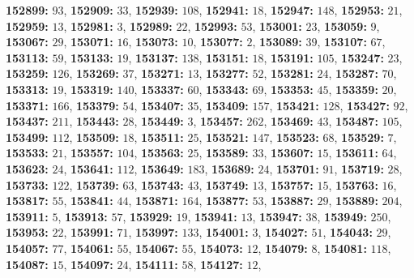 \textsf{\bfseries 152899:} $93$, \textsf{\bfseries 152909:} $33$, \textsf{\bfseries 152939:} $108$, \textsf{\bfseries 152941:} $18$, \textsf{\bfseries 152947:} $148$, \textsf{\bfseries 152953:} $21$, \textsf{\bfseries 152959:} $13$, \textsf{\bfseries 152981:} $3$, \textsf{\bfseries 152989:} $22$, \textsf{\bfseries 152993:} $53$, \textsf{\bfseries 153001:} $23$, \textsf{\bfseries 153059:} $9$, \textsf{\bfseries 153067:} $29$, \textsf{\bfseries 153071:} $16$, \textsf{\bfseries 153073:} $10$, \textsf{\bfseries 153077:} $2$, \textsf{\bfseries 153089:} $39$, \textsf{\bfseries 153107:} $67$, \textsf{\bfseries 153113:} $59$, \textsf{\bfseries 153133:} $19$, \textsf{\bfseries 153137:} $138$, \textsf{\bfseries 153151:} $18$, \textsf{\bfseries 153191:} $105$, \textsf{\bfseries 153247:} $23$, \textsf{\bfseries 153259:} $126$, \textsf{\bfseries 153269:} $37$, \textsf{\bfseries 153271:} $13$, \textsf{\bfseries 153277:} $52$, \textsf{\bfseries 153281:} $24$, \textsf{\bfseries 153287:} $70$, \textsf{\bfseries 153313:} $19$, \textsf{\bfseries 153319:} $140$, \textsf{\bfseries 153337:} $60$, \textsf{\bfseries 153343:} $69$, \textsf{\bfseries 153353:} $45$, \textsf{\bfseries 153359:} $20$, \textsf{\bfseries 153371:} $166$, \textsf{\bfseries 153379:} $54$, \textsf{\bfseries 153407:} $35$, \textsf{\bfseries 153409:} $157$, \textsf{\bfseries 153421:} $128$, \textsf{\bfseries 153427:} $92$, \textsf{\bfseries 153437:} $211$, \textsf{\bfseries 153443:} $28$, \textsf{\bfseries 153449:} $3$, \textsf{\bfseries 153457:} $262$, \textsf{\bfseries 153469:} $43$, \textsf{\bfseries 153487:} $105$, \textsf{\bfseries 153499:} $112$, \textsf{\bfseries 153509:} $18$, \textsf{\bfseries 153511:} $25$, \textsf{\bfseries 153521:} $147$, \textsf{\bfseries 153523:} $68$, \textsf{\bfseries 153529:} $7$, \textsf{\bfseries 153533:} $21$, \textsf{\bfseries 153557:} $104$, \textsf{\bfseries 153563:} $25$, \textsf{\bfseries 153589:} $33$, \textsf{\bfseries 153607:} $15$, \textsf{\bfseries 153611:} $64$, \textsf{\bfseries 153623:} $24$, \textsf{\bfseries 153641:} $112$, \textsf{\bfseries 153649:} $183$, \textsf{\bfseries 153689:} $24$, \textsf{\bfseries 153701:} $91$, \textsf{\bfseries 153719:} $28$, \textsf{\bfseries 153733:} $122$, \textsf{\bfseries 153739:} $63$, \textsf{\bfseries 153743:} $43$, \textsf{\bfseries 153749:} $13$, \textsf{\bfseries 153757:} $15$, \textsf{\bfseries 153763:} $16$, \textsf{\bfseries 153817:} $55$, \textsf{\bfseries 153841:} $44$, \textsf{\bfseries 153871:} $164$, \textsf{\bfseries 153877:} $53$, \textsf{\bfseries 153887:} $29$, \textsf{\bfseries 153889:} $204$, \textsf{\bfseries 153911:} $5$, \textsf{\bfseries 153913:} $57$, \textsf{\bfseries 153929:} $19$, \textsf{\bfseries 153941:} $13$, \textsf{\bfseries 153947:} $38$, \textsf{\bfseries 153949:} $250$, \textsf{\bfseries 153953:} $22$, \textsf{\bfseries 153991:} $71$, \textsf{\bfseries 153997:} $133$, \textsf{\bfseries 154001:} $3$, \textsf{\bfseries 154027:} $51$, \textsf{\bfseries 154043:} $29$, \textsf{\bfseries 154057:} $77$, \textsf{\bfseries 154061:} $55$, \textsf{\bfseries 154067:} $55$, \textsf{\bfseries 154073:} $12$, \textsf{\bfseries 154079:} $8$, \textsf{\bfseries 154081:} $118$, \textsf{\bfseries 154087:} $15$, \textsf{\bfseries 154097:} $24$, \textsf{\bfseries 154111:} $58$, \textsf{\bfseries 154127:} $12$, 
